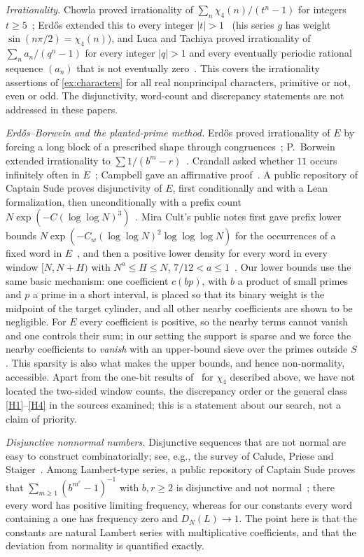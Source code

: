 \documentclass[11pt]{article}
\begin{document}
\emph{Irrationality.} Chowla proved irrationality of
$\sum_n\chi_4(n)/(t^n-1)$ for integers $t\ge5$~\cite{Chowla1947}; Erd\H{o}s
extended this to every integer $|t|>1$~\cite{Erdos1948} (his series $g$ has
weight $\sin(n\pi/2)=\chi_4(n)$), and Luca and Tachiya proved irrationality of
$\sum_n a_n/(q^n-1)$ for every integer $|q|>1$ and every eventually periodic
rational sequence $(a_n)$ that is not eventually zero~\cite{LucaTachiya2014}.
This covers the irrationality assertions of \cref{ex:characters} for all real
nonprincipal characters, primitive or not, even or odd. The disjunctivity,
word-count and discrepancy statements are not addressed in these papers.

\emph{Erd\H{o}s--Borwein and the planted-prime method.} Erd\H{o}s proved
irrationality of $E$ by forcing a long block of a prescribed shape through
congruences~\cite{Erdos1948}; P.~Borwein extended irrationality to
$\sum1/(b^m-r)$~\cite{Borwein1992}. Crandall asked whether $11$ occurs
infinitely often in $E$~\cite{Crandall2012}; Campbell gave an affirmative
proof~\cite{Campbell2026}. A public repository of Captain Sude proves
disjunctivity of $E$, first conditionally and with a Lean formalization, then
unconditionally with a prefix count $N\exp(-C(\log\log N)^3)$~\cite{SudeDisj,SudeElem}.
Mira Cult's public notes first gave prefix lower bounds
$N\exp(-C_w(\log\log N)^2\log\log\log N)$ for the occurrences of a fixed word in
$E$~\cite{MiraGist}, and then a positive lower density for every word in every
window $[N,N+H)$ with $N^a\le H\le N$, $7/12<a\le1$~\cite{MiraCult}. Our lower
bounds use the same basic mechanism: one coefficient $c(bp)$, with $b$ a
product of small primes and $p$ a prime in a short interval, is placed so that
its binary weight is the midpoint of the target cylinder, and all other nearby
coefficients are shown to be negligible. For $E$ every coefficient is positive,
so the nearby terms cannot vanish and one controls their sum; in our setting the
support is sparse and we force the nearby coefficients to \emph{vanish} with an
upper-bound sieve over the primes outside $S$. This sparsity is also what makes
the upper bounds, and hence non-normality, accessible. Apart from the one-bit
results of~\cite{BBCP2004} for $\chi_4$ described above, we have not located the
two-sided window counts, the discrepancy order or the general class
\ref{H1}--\ref{H4} in the sources examined; this is a statement about our
search, not a claim of priority.

\emph{Disjunctive nonnormal numbers.} Disjunctive sequences that are not normal
are easy to construct combinatorially; see, e.g., the survey of Calude, Priese and
Staiger~\cite{CaludePrieseStaiger1997}. Among Lambert-type series, a public
repository of Captain Sude proves that $\sum_{m\ge1}(b^{m^r}-1)^{-1}$ with
$b,r\ge2$ is disjunctive and not normal~\cite{SudePower}; there every word has
positive limiting frequency, whereas for our constants every word containing a
one has frequency zero and $D_N(L)\to1$. The point here is that the constants
are natural Lambert series with multiplicative coefficients, and that the
deviation from normality is quantified exactly.
\end{document}
